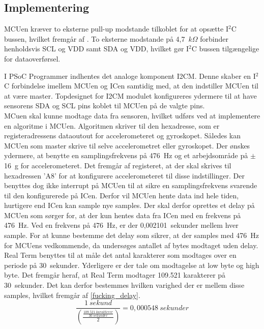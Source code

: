 \subsection{Implementering}
MCUen kræver to eksterne pull-up modstande tilkoblet for at opsætte I$^{2}$C bussen, hvilket fremgår af . To eksterne modstande på 4,7~$k\Omega$ forbinder henholdsvis SCL og VDD samt SDA og VDD, hvilket gør I$^{2}$C bussen tilgængelige for dataoverførsel.

I PSoC Programmer indhentes det analoge komponent I2CM. Denne skaber en I$^2$C forbindelse imellem MCUen og ICen samtidig med, at den indstiller MCUen til at være master. %
Topdesignet for I2CM modulet konfigureres ydermere til at have sensorens SDA og SCL pins koblet til MCUen på de valgte pins.\\
MCuen skal kunne modtage data fra sensoren, hvilket udførs ved at implementere en algoritme i MCUen. Algoritmen skriver til den hexadresse, som er registeradressens dataoutout for accelerometeret og gyroskopet. Således kan MCUen som master skrive til selve accelerometret eller gyroskopet. Der ønskes ydermere, at benytte en samplingsfrekvens på 476~Hz og et arbejdsområde på $\pm$16~g for accelerometeret. Det fremgår af registeret, at der skal skrives til hexadressen 'A8' for at konfigurere accelerometeret til disse indstillinger. Der benyttes dog ikke interrupt på MCUen til at sikre en samplingsfrekvens svarende til den konfigurerede på ICen. Derfor vil MCUen hente data ind hele tiden, hurtigere end ICen kan sample nye samples. Der skal derfor oprettes et delay på MCUen som sørger for, at der kun hentes data fra ICen med en frekvens på 476~Hz. Ved en frekvens på 476~Hz, er der 0,002101~sekunder mellem hver sample. For at kunne bestemme det delay som sikrer, at der samples med 476~Hz for MCUens vedkommende, da undersøges antallet af bytes modtaget uden delay. Real Term benyttes til at måle det antal karakterer som modtages over en periode på 30~sekunder. Yderligere er der tale om modtagelse at low byte og high byte. Det fremgår heraf, at Real Term modtager 109.521 karakterer på 30~sekunder. Det kan derfor bestemmes hvilken varighed der er mellem disse samples, hvilket fremgår af \eqref{fucking_delay}.
\begin{equation}
\frac{1~sekund}{\left(\frac{\frac{109.521~karakterer}{30~sekunder}}{2}\right)} = 0,000548~sekunder
\end{equation} \label{fucking_delay}
